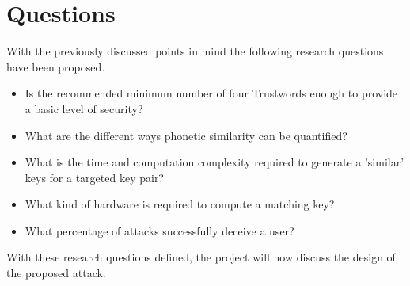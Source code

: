 \section{Questions}

With the previously discussed points in mind the following research questions have been proposed.

\begin{itemize}
    \item Is the recommended minimum number of four Trustwords enough to provide a basic level of security?
    
    \item What are the different ways phonetic similarity can be quantified?

    \item What is the time and computation complexity required to generate a 'similar' keys for a targeted key pair?
    
    \item What kind of hardware is required to compute a matching key?

    \item What percentage of attacks successfully deceive a user?
\end{itemize}

With these research questions defined, the project will now discuss the design of the proposed attack.